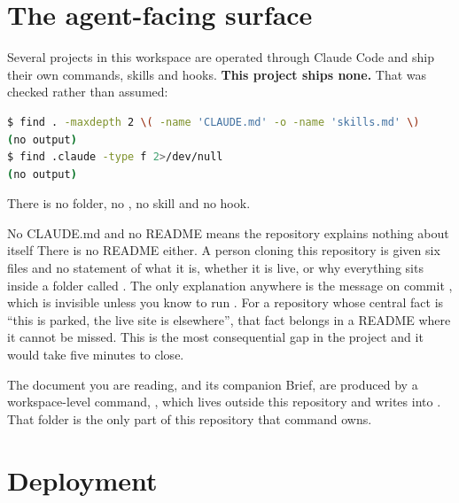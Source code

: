 \documentclass[11pt,a4paper]{article}
\begin{document}
\section{The agent-facing surface}

Several projects in this workspace are operated through Claude Code and ship
their own commands, skills and hooks. \textbf{This project ships none.} That was
checked rather than assumed:

\begin{lstlisting}[language=bash,caption={The check, and its result}]
$ find . -maxdepth 2 \( -name 'CLAUDE.md' -o -name 'skills.md' \)
(no output)
$ find .claude -type f 2>/dev/null
(no output)
\end{lstlisting}

There is no  folder, no , no skill and no hook.

\begin{honest}{No CLAUDE.md and no README means the repository explains nothing
about itself}
There is no README either. A person cloning this repository is given six files
and no statement of what it is, whether it is live, or why everything sits inside
a folder called . The only explanation anywhere is the
message on commit , which is invisible unless you know to run
. For a repository whose central fact is ``this is parked, the live
site is elsewhere'', that fact belongs in a README where it cannot be missed. This
is the most consequential gap in the project and it would take five minutes to
close.
\end{honest}

The document you are reading, and its companion Brief, are produced by a
workspace-level command, , which lives outside this
repository and writes into . That folder is the only part
of this repository that command owns.

\section{Deployment}
\end{document}
